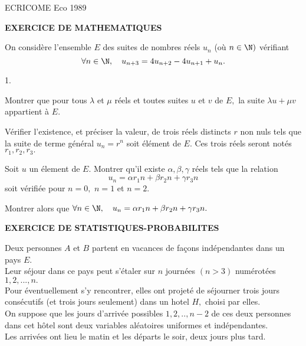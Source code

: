 \documentclass[11pt]{article}%
\begin{document}
\begin{center}
{\Huge ECRICOME Eco 1989}
\end{center}

\begin{center}
\textbf{EXERCICE DE MATHEMATIQUES}
\end{center}

On considère l'ensemble $E$ des suites de nombres réels $u_{n}$ (où
$n\in 
\N)$ vérifiant 
\[
\forall n\in \N,\quad u_{n + 3} = 4u_{n + 2}-4u_{n + 1} + u_{n}.
\]

\begin{noliste}{1.}
 \setlength{\itemsep}{4mm}
\item Montrer que pour tous $\lambda $ et $\mu $ réels et toutes suites
$u$
et $v$ de $E,$ la suite $\lambda u + \mu v$ appartient à $E.$

\item Vérifier l'existence, et préciser la valeur, de trois réels
distincts $r$ non nuls tels que la suite de terme général $u_{n} =
r^{n}$ soit élément de 
$E.$ Ces trois réels seront notés $r_{1},r_{2},r_{3}.$

\item Soit $u$ un élement de $E.$ Montrer qu'il existe
$\alpha,\beta,\gamma $ réels tels que la relation 
\[
u_{n} = \alpha r_{1}{n} + \beta r_{2}{n} + \gamma r_{3}{n}
\]
soit vérifiée pour $n = 0,$ $n = 1$ et $n = 2.$

\item Montrer alors que $\forall n\in \N,\quad u_{n} = \alpha
r_{1}{n} + \beta r_{2}{n} + \gamma r_{3}{n}.$
\end{noliste}

\begin{center}
\textbf{EXERCICE DE STATISTIQUES-PROBABILITES}
\end{center}

\noindent Deux personnes $A$ et $B$ partent en vacances de façons
indépendantes dans un pays $E.$ \\
Leur séjour dans ce pays peut s'étaler sur $n$ journées $(n>3)$
numérotées $1,2,...,n.$\\
Pour éventuellement s'y rencontrer, elles ont projeté de séjourner
trois
jours consécutifs (et trois jours seulement) dans un hotel $H,$ choisi
par
elles.\\
On suppose que les jours d'arrivée possibles $1,2,..,n-2$ de ces deux
personnes dans cet hôtel sont deux variables aléatoires uniformes et
indépendantes.\\
Les arrivées ont lieu le matin et les départs le soir, deux jours plus
tard.
\end{document}
